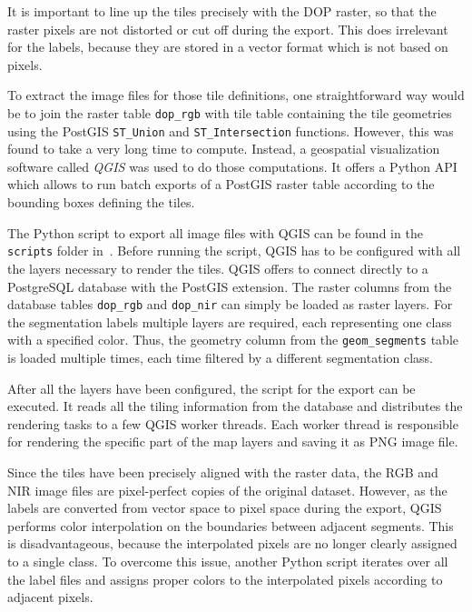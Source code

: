 It is important to line up the tiles precisely with the DOP raster, so that the raster pixels are not distorted or cut off during the export. This does irrelevant for the labels, because they are stored in a vector format which is not based on pixels.

To extract the image files for those tile definitions, one straightforward way would be to join the raster table \texttt{dop\_rgb} with tile table containing the tile geometries using the PostGIS \texttt{ST\_Union} and \texttt{ST\_Intersection} functions. However, this was found to take a very long time to compute. Instead, a geospatial visualization software called \emph{QGIS} was used to do those computations. It offers a Python API which allows to run batch exports of a PostGIS raster table according to the bounding boxes defining the tiles.

The Python script to export all image files with QGIS can be found in the \texttt{scripts} folder in~\cite{thesis-code20}. Before running the script, QGIS has to be configured with all the layers necessary to render the tiles. QGIS offers to connect directly to a PostgreSQL database with the PostGIS extension. The raster columns from the database tables \texttt{dop\_rgb} and \texttt{dop\_nir} can simply be loaded as raster layers. For the segmentation labels multiple layers are required, each representing one class with a specified color. Thus, the geometry column from the \texttt{geom\_segments} table is loaded multiple times, each time filtered by a different segmentation class.

After all the layers have been configured, the script for the export can be executed. It reads all the tiling information from the database and distributes the rendering tasks to a few QGIS worker threads. Each worker thread is responsible for rendering the specific part of the map layers and saving it as PNG image file.

Since the tiles have been precisely aligned with the raster data, the RGB and NIR image files are pixel-perfect copies of the original dataset. However, as the labels are converted from vector space to pixel space during the export, QGIS performs color interpolation on the boundaries between adjacent segments. This is disadvantageous, because the interpolated pixels are no longer clearly assigned to a single class. To overcome this issue, another Python script iterates over all the label files and assigns proper colors to the interpolated pixels according to adjacent pixels.

